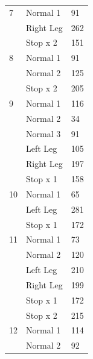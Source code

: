 \documentclass[11pt]{article} %
\begin{document}
\begin{appendices}
\begin{table}[]
\begin{longtable}{lll}
7       & Normal 1                        & 91                         \\
        & Right Leg                       & 262                        \\
        & Stop x 2                        & 151                        \\ \hline
8       & Normal 1                        & 91                         \\
        & Normal 2                        & 125                        \\
        & Stop x 2                        & 205                        \\ \hline
9       & Normal 1                        & 116                        \\
        & Normal 2                        & 34                         \\
        & Normal 3                        & 91                         \\
        & Left Leg                        & 105                        \\
        & Right Leg                       & 197                        \\
        & Stop x 1                        & 158                        \\ \hline
10      & Normal 1                        & 65                         \\
        & Left Leg                        & 281                        \\
        & Stop x 1                        & 172                        \\ \hline
11      & Normal 1                        & 73                         \\
        & Normal 2                        & 120                        \\
        & Left Leg                        & 210                        \\
        & Right Leg                       & 199                        \\
        & Stop x 1                        & 172                        \\
        & Stop x 2                        & 215                        \\ \hline
12      & Normal 1                        & 114                        \\
        & Normal 2                        & 92                         \\

\end{longtable}
\end{table}
\end{appendices}
\end{document}
